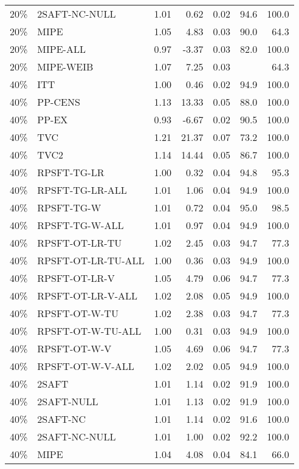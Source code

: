 \begin{table}[ht]
{\begin{tabular}{llrrrrr}
  20\% & 2SAFT-NC-NULL & 1.01 & 0.62 & 0.02 & 94.6 & 100.0 \\ 
  20\% & MIPE & 1.05 & 4.83 & 0.03 & 90.0 & 64.3 \\ 
  20\% & MIPE-ALL & 0.97 & -3.37 & 0.03 & 82.0 & 100.0 \\ 
  20\% & MIPE-WEIB & 1.07 & 7.25 & 0.03 &  & 64.3 \\ 
   \hline
40\% & ITT & 1.00 & 0.46 & 0.02 & 94.9 & 100.0 \\ 
  40\% & PP-CENS & 1.13 & 13.33 & 0.05 & 88.0 & 100.0 \\ 
  40\% & PP-EX & 0.93 & -6.67 & 0.02 & 90.5 & 100.0 \\ 
  40\% & TVC & 1.21 & 21.37 & 0.07 & 73.2 & 100.0 \\ 
  40\% & TVC2 & 1.14 & 14.44 & 0.05 & 86.7 & 100.0 \\ 
   \hline
40\% & RPSFT-TG-LR & 1.00 & 0.32 & 0.04 & 94.8 & 95.3 \\ 
  40\% & RPSFT-TG-LR-ALL & 1.01 & 1.06 & 0.04 & 94.9 & 100.0 \\ 
  40\% & RPSFT-TG-W & 1.01 & 0.72 & 0.04 & 95.0 & 98.5 \\ 
  40\% & RPSFT-TG-W-ALL & 1.01 & 0.97 & 0.04 & 94.9 & 100.0 \\ 
  40\% & RPSFT-OT-LR-TU & 1.02 & 2.45 & 0.03 & 94.7 & 77.3 \\ 
  40\% & RPSFT-OT-LR-TU-ALL & 1.00 & 0.36 & 0.03 & 94.9 & 100.0 \\ 
  40\% & RPSFT-OT-LR-V & 1.05 & 4.79 & 0.06 & 94.7 & 77.3 \\ 
  40\% & RPSFT-OT-LR-V-ALL & 1.02 & 2.08 & 0.05 & 94.9 & 100.0 \\ 
   \hline
40\% & RPSFT-OT-W-TU & 1.02 & 2.38 & 0.03 & 94.7 & 77.3 \\ 
  40\% & RPSFT-OT-W-TU-ALL & 1.00 & 0.31 & 0.03 & 94.9 & 100.0 \\ 
  40\% & RPSFT-OT-W-V & 1.05 & 4.69 & 0.06 & 94.7 & 77.3 \\ 
  40\% & RPSFT-OT-W-V-ALL & 1.02 & 2.02 & 0.05 & 94.9 & 100.0 \\ 
   \hline
40\% & 2SAFT & 1.01 & 1.14 & 0.02 & 91.9 & 100.0 \\ 
  40\% & 2SAFT-NULL & 1.01 & 1.13 & 0.02 & 91.9 & 100.0 \\ 
  40\% & 2SAFT-NC & 1.01 & 1.14 & 0.02 & 91.6 & 100.0 \\ 
  40\% & 2SAFT-NC-NULL & 1.01 & 1.00 & 0.02 & 92.2 & 100.0 \\ 
  40\% & MIPE & 1.04 & 4.08 & 0.04 & 84.1 & 66.0 \\ 

\end{tabular}}
\end{table}
